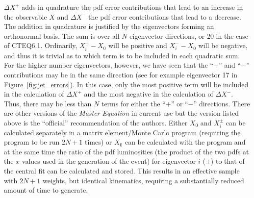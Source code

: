 \documentclass[12pt]{iopart}
\begin{document}
$\Delta X^{+}$ adds in quadrature the pdf error contributions that lead to an increase in the observable $X$ and
$\Delta X^{-}$ the pdf error contributions that lead to a decrease. The addition in quadrature is justified by the
eigenvectors forming an orthonormal basis. The sum is over all $N$ eigenvector directions, or $20$ in the case of
CTEQ6.1. Ordinarily, $X^{+}_{i}-X_{0}$ will be positive and $X^{-}_{i}-X_{0}$ will be negative, and thus it is
trivial as to which term is to be included in each quadratic sum. For the higher number eigenvectors, however, we
have seen that the ``$+$'' and ``$-$'' contributions may be in the same direction (see for example eigenvector 17 in
Figure~\ref{fig:jet_errors}). In this case, only the most positive term will be included in the calculation of
$\Delta X^{+}$ and the most negative in the calculation of $\Delta X^{-}$.
Thus, there may be less than $N$ terms for either
the ``$+$'' or ``$-$'' directions. There are other versions of the {\it Master Equation} in current use but the
version listed above is the ``official'' recommendation of the authors. 
Either $X_0$ and $X_i^{\pm}$ can be calculated separately in a matrix element/Monte Carlo program (requiring the
program to be run $2N+1$ times) or $X_0$ can be calculated with the program and at the same time the ratio of the pdf
luminosities (the product of the two pdfs at the $x$ values used in the generation of the event) for eigenvector $i$
($\pm$) to that of the central fit can be calculated and stored. This results in an effective sample with $2N+1$
weights, but identical kinematics, requiring a substantially reduced amount of time to generate.  
\end{document}
